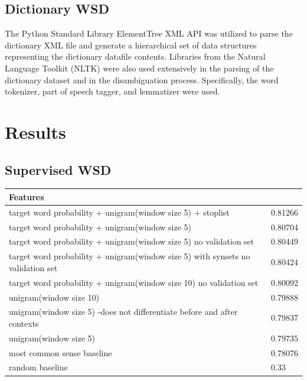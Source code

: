 \documentclass[11pt]{article}
\begin{document}
\subsection{Dictionary WSD}
The Python Standard Library ElementTree XML API was utilized to parse the dictionary XML file and generate a hierarchical set of data structures representing the dictionary datafile contents. Libraries from the Natural Language Toolkit (NLTK) were also used extensively in the parsing of the dictionary dataset and in the disambiguation process. Specifically, the word tokenizer, part of speech tagger, and lemmatizer were used.

\section{Results}
\subsection{Supervised WSD}
\begin{table}[H]
    \begin{tabular}{|l|l|}
    \hline
    Features                                                                        & ~       \\ \hline
    target word probability + unigram(window size 5) + stoplist                     & 0.81266 \\ \hline
    target word probability + unigram(window size 5)                                & 0.80704 \\ \hline
    target word probability + unigram(window size 5) no validation set              & 0.80449 \\ \hline
    target word probability + unigram(window size 5) with synsets no validation set & 0.80424 \\ \hline
    target word probability + unigram(window size 10) no validation set             & 0.80092 \\ \hline
    unigram(window size 10)                                                         & 0.79888 \\ \hline
    unigram(window size 5) -does not differentiate before and after contexts                                                        & 0.79837 \\ \hline
    unigram(window size 5)                                                          & 0.79735 \\ \hline
    most common sense baseline                                                      & 0.78076 \\ \hline
    random baseline                                                                 & 0.33     \\ \hline
    \end{tabular}
\end{table}
\end{document}
